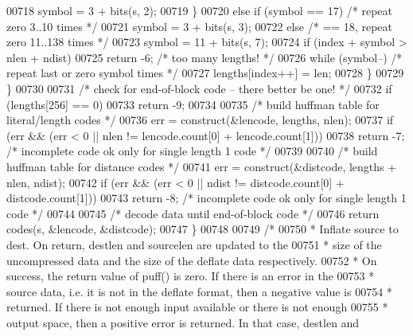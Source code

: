 \begin{DoxyCode}
00718                 symbol = 3 + bits(s, 2);
00719             \}
00720             \textcolor{keywordflow}{else} \textcolor{keywordflow}{if} (symbol == 17)      \textcolor{comment}{/* repeat zero 3..10 times */}
00721                 symbol = 3 + bits(s, 3);
00722             \textcolor{keywordflow}{else}                        \textcolor{comment}{/* == 18, repeat zero 11..138 times */}
00723                 symbol = 11 + bits(s, 7);
00724             \textcolor{keywordflow}{if} (index + symbol > nlen + ndist)
00725                 \textcolor{keywordflow}{return} -6;              \textcolor{comment}{/* too many lengths! */}
00726             \textcolor{keywordflow}{while} (symbol--)            \textcolor{comment}{/* repeat last or zero symbol times */}
00727                 lengths[index++] = len;
00728         \}
00729     \}
00730 
00731     \textcolor{comment}{/* check for end-of-block code -- there better be one! */}
00732     \textcolor{keywordflow}{if} (lengths[256] == 0)
00733         \textcolor{keywordflow}{return} -9;
00734 
00735     \textcolor{comment}{/* build huffman table for literal/length codes */}
00736     err = construct(&lencode, lengths, nlen);
00737     \textcolor{keywordflow}{if} (err && (err < 0 || nlen != lencode.count[0] + lencode.count[1]))
00738         \textcolor{keywordflow}{return} -7;      \textcolor{comment}{/* incomplete code ok only for single length 1 code */}
00739 
00740     \textcolor{comment}{/* build huffman table for distance codes */}
00741     err = construct(&distcode, lengths + nlen, ndist);
00742     \textcolor{keywordflow}{if} (err && (err < 0 || ndist != distcode.count[0] + distcode.count[1]))
00743         \textcolor{keywordflow}{return} -8;      \textcolor{comment}{/* incomplete code ok only for single length 1 code */}
00744 
00745     \textcolor{comment}{/* decode data until end-of-block code */}
00746     \textcolor{keywordflow}{return} codes(s, &lencode, &distcode);
00747 \}
00748 
00749 \textcolor{comment}{/*}
00750 \textcolor{comment}{ * Inflate source to dest.  On return, destlen and sourcelen are updated to the}
00751 \textcolor{comment}{ * size of the uncompressed data and the size of the deflate data respectively.}
00752 \textcolor{comment}{ * On success, the return value of puff() is zero.  If there is an error in the}
00753 \textcolor{comment}{ * source data, i.e. it is not in the deflate format, then a negative value is}
00754 \textcolor{comment}{ * returned.  If there is not enough input available or there is not enough}
00755 \textcolor{comment}{ * output space, then a positive error is returned.  In that case, destlen and}

\end{DoxyCode}
